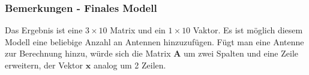 {\subsubsection{Bemerkungen - Finales Modell}
%
Das Ergebnis ist eine $3\times10$ Matrix und ein $1\times10$ Vaktor. Es ist möglich diesem Modell eine beliebige Anzahl an Antennen hinzuzufügen. Fügt man eine Antenne zur Berechnung hinzu, würde sich die Matrix $\mathbf{A}$ um zwei Spalten und eine Zeile erweitern, der Vektor $\mathbf{x}$ analog um 2 Zeilen.

}
